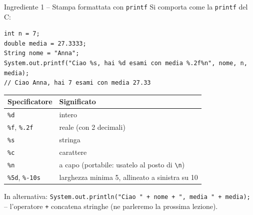 \documentclass[10pt,aspectratio=169]{beamer}
\begin{document}
\begin{frame}[fragile]{Ingrediente 1 -- Stampa formattata con \texttt{printf}}
Si comporta come la \texttt{printf} del C:
\begin{lstlisting}
int n = 7;
double media = 27.3333;
String nome = "Anna";
System.out.printf("Ciao %s, hai %d esami con media %.2f%n", nome, n, media);
// Ciao Anna, hai 7 esami con media 27.33
\end{lstlisting}

\begin{center}\small
\begin{tabular}{ll}
\toprule
\textbf{Specificatore} & \textbf{Significato} \\
\midrule
\texttt{\%d} & intero \\
\texttt{\%f}, \texttt{\%.2f} & reale (con 2 decimali) \\
\texttt{\%s} & stringa \\
\texttt{\%c} & carattere \\
\texttt{\%n} & a capo (portabile: usatelo al posto di \texttt{\textbackslash n}) \\
\texttt{\%5d}, \texttt{\%-10s} & larghezza minima 5, allineato a sinistra su 10 \\
\bottomrule
\end{tabular}
\end{center}

\small In alternativa: \texttt{System.out.println("Ciao " + nome + ", media " + media);} -- l'operatore \texttt{+} concatena stringhe (ne parleremo la prossima lezione).
\end{frame}
\end{document}
